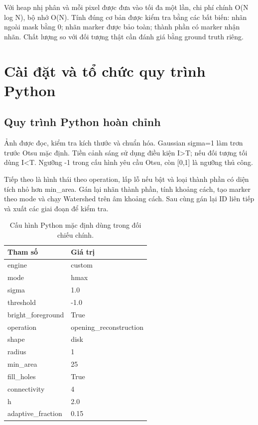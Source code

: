 \documentclass[12pt,a4paper,oneside]{report}
\begin{document}
Với heap nhị phân và mỗi pixel được đưa vào tối đa một lần, chi phí chính O(N log N), bộ nhớ O(N). Tính đúng cơ bản được kiểm tra bằng các bất biến: nhãn ngoài mask bằng 0; nhãn marker được bảo toàn; thành phần có marker nhận nhãn. Chất lượng so với đối tượng thật cần đánh giá bằng ground truth riêng.

\chapter{Cài đặt và tổ chức quy trình Python}\label{chap:implementation}

\section{Quy trình Python hoàn chỉnh}
Ảnh được đọc, kiểm tra kích thước và chuẩn hóa. Gaussian sigma=1 làm trơn trước Otsu mặc định. Tiền cảnh sáng sử dụng điều kiện I>T; nếu đối tượng tối dùng I<T. Ngưỡng -1 trong cấu hình yêu cầu Otsu, còn [0,1] là ngưỡng thủ công.

Tiếp theo là hình thái theo operation, lấp lỗ nếu bật và loại thành phần có diện tích nhỏ hơn min\_area. Gán lại nhãn thành phần, tính khoảng cách, tạo marker theo mode và chạy Watershed trên âm khoảng cách. Sau cùng gán lại ID liên tiếp và xuất các giai đoạn để kiểm tra.

\begin{table}[H]\centering\small
\caption{Cấu hình Python mặc định dùng trong đối chiếu chính.}\label{tab:parameters}
\begin{tabularx}{\linewidth}{X X}
\toprule
\textbf{Tham số} & \textbf{Giá trị} \\ \midrule
engine & custom \\
mode & hmax \\
sigma & 1.0 \\
threshold & -1.0 \\
bright\_foreground & True \\
operation & opening\_reconstruction \\
shape & disk \\
radius & 1 \\
min\_area & 25 \\
fill\_holes & True \\
connectivity & 4 \\
h & 2.0 \\
adaptive\_fraction & 0.15 \\
\bottomrule\end{tabularx}\end{table}
\end{document}
